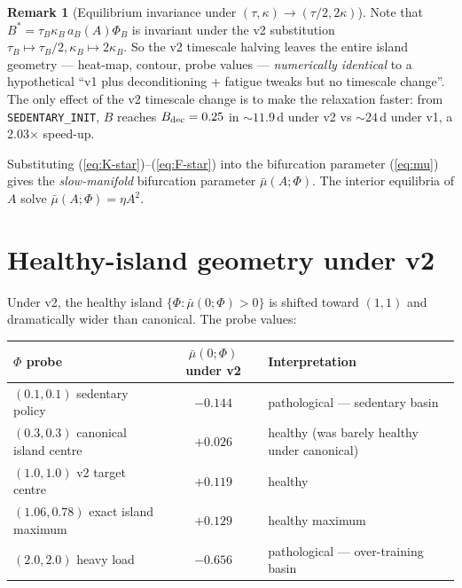 \documentclass[11pt,a4paper]{article}
\theoremstyle{definition}
\newtheorem{remark}[theorem]{Remark}
\begin{document}
\begin{remark}[Equilibrium invariance under $(\tau, \kappa) \to (\tau/2, 2\kappa)$]
Note that $B^* = \tau_B \kappa_B \, a_B(A) \Phi_B$ is invariant under the v2 substitution $\tau_B \mapsto \tau_B/2, \kappa_B \mapsto 2\kappa_B$. So the v2 timescale halving leaves the entire island geometry — heat-map, contour, probe values — \emph{numerically identical} to a hypothetical ``v1 plus deconditioning + fatigue tweaks but no timescale change''. The only effect of the v2 timescale change is to make the relaxation faster: from \texttt{SEDENTARY\_INIT}, $B$ reaches $B_{\rm dec} = 0.25$ in $\sim 11.9$\,d under v2 vs $\sim 24$\,d under v1, a 2.03× speed-up.
\end{remark}

Substituting (\ref{eq:K-star})--(\ref{eq:F-star}) into the bifurcation parameter (\ref{eq:mu}) gives the \emph{slow-manifold} bifurcation parameter $\bar\mu(A; \Phi)$. The interior equilibria of $A$ solve $\bar\mu(A; \Phi) = \eta A^2$.

\section{Healthy-island geometry under v2} \label{sec:island-geometry}

Under v2, the healthy island $\{\Phi : \bar\mu(0; \Phi) > 0\}$ is shifted toward $(1, 1)$ and dramatically wider than canonical. The probe values:

\begin{center}\small
\begin{tabular}{lcl}
\toprule
$\Phi$ probe & $\bar\mu(0; \Phi)$ under v2 & Interpretation \\
\midrule
$(0.1, 0.1)$ sedentary policy & $-0.144$ & pathological — sedentary basin \\
$(0.3, 0.3)$ canonical island centre & $+0.026$ & healthy (was barely healthy under canonical) \\
$(1.0, 1.0)$ v2 target centre & $+0.119$ & healthy \\
$(1.06, 0.78)$ exact island maximum & $+0.129$ & healthy maximum \\
$(2.0, 2.0)$ heavy load & $-0.656$ & pathological — over-training basin \\
\bottomrule
\end{tabular}
\end{center}
\end{document}
